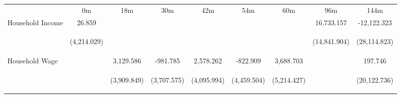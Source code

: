 \begin{tabular}{lcccccccc}
\hline \noalign{\smallskip} & 0m & 18m & 30m & 42m & 54m & 60m & 96m & 144m\\
\noalign{\smallskip}\hline \noalign{\smallskip}Household Income & 26.859 &  &  &  &  &  & 16,733.157 & -12,122.323\\
 & \begin{footnotesize}(4,214.029)\end{footnotesize} & \begin{footnotesize}\end{footnotesize} & \begin{footnotesize}\end{footnotesize} & \begin{footnotesize}\end{footnotesize} & \begin{footnotesize}\end{footnotesize} & \begin{footnotesize}\end{footnotesize} & \begin{footnotesize}(14,841.904)\end{footnotesize} & \begin{footnotesize}(28,114.823)\end{footnotesize}\\
\noalign{\smallskip}Household Wage &  & 3,129.586 & -981.785 & 2,578.262 & -822.909 & 3,688.703 &  & 197.746\\
 & \begin{footnotesize}\end{footnotesize} & \begin{footnotesize}(3,909.849)\end{footnotesize} & \begin{footnotesize}(3,707.575)\end{footnotesize} & \begin{footnotesize}(4,095.994)\end{footnotesize} & \begin{footnotesize}(4,459.504)\end{footnotesize} & \begin{footnotesize}(5,214.427)\end{footnotesize} & \begin{footnotesize}\end{footnotesize} & \begin{footnotesize}(20,122.736)\end{footnotesize}\\

\end{tabular}
